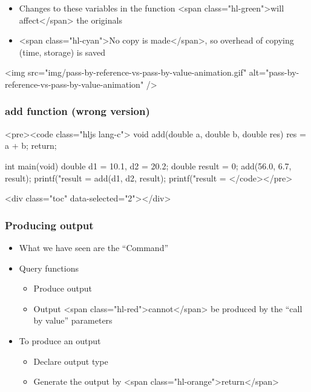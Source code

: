 \documentclass{../c-lecture}
\begin{document}
\begin{frame}
\begin{frame}
\begin{itemize}
      \item
        Changes to these variables in the function
        <span class="hl-green">will affect</span> the originals

      \item
        <span class="hl-cyan">No copy is made</span>, so overhead of copying
        (time, storage) is saved

    \end{itemize}
  \end{frame}
  \begin{frame}
    <img
      src="img/pass-by-reference-vs-pass-by-value-animation.gif"
      alt="pass-by-reference-vs-pass-by-value-animation"
    />
  \end{frame}
\end{frame}
\begin{frame}
  \frametitle{add function (wrong version)}
  <pre><code class="hljs lang-c">
void add(double a, double b, double res){
  res = a + b;
  return;
}

int main(void){
  double d1 = 10.1, d2 = 20.2;
  double result = 0;
  add(56.0, 6.7, result);
  printf("result = %
  add(d1, d2, result);
  printf("result = %
}
  </code></pre>
\end{frame}
\begin{frame}
  <div class="toc" data-selected="2"></div>
\end{frame}
\begin{frame}
  \frametitle{Producing output}
  \begin{itemize}
    \item What we have seen are the “Command”
    \item Query functions
    \begin{itemize}
      \item Produce output
      \item
        Output <span class="hl-red">cannot</span> be produced by the “call by
        value” parameters

    \end{itemize}
    \item To produce an output
    \begin{itemize}
      \item Declare output type
      \item Generate the output by <span class="hl-orange">return</span>
    \end{itemize}
  \end{itemize}
\end{frame}
\end{document}
